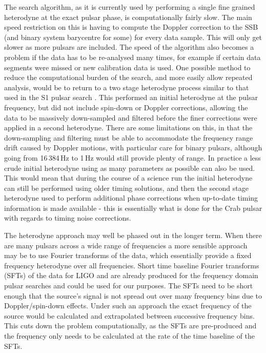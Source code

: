 The search algorithm, as it is currently used by performing a single fine grained heterodyne at the
exact pulsar phase, is computationally fairly slow. The main speed restriction on this is having to
compute the Doppler correction to the SSB (and binary system barycentre for some) for every data
sample. This will only get slower as more pulsars are included. The speed of the algorithm also
becomes a problem if the data has to be re-analysed many times, for example if certain data segments
were missed or new calibration data is used. One possible method to reduce the computational burden
of the search, and more easily allow repeated analysis, would be to return to a two stage heterodyne
process similar to that used in the S1 pulsar search \cite{Abbott:2004}. This performed an initial
heterodyne at the pulsar frequency, but did not include spin-down or Doppler corrections, allowing
the data to be massively down-sampled and filtered before the finer corrections were applied in a
second heterodyne. There are some limitations on this, in that the down-sampling and filtering must
be able to accommodate the frequency range drift caused by Doppler motions, with particular care for
binary pulsars, although going from 16\,384\,Hz to 1\,Hz would still provide plenty of range. In
practice a less crude initial heterodyne using as many parameters as possible can also be used. This
would mean that during the course of a science run the initial heterodyne can still be performed
using older timing solutions, and then the second stage heterodyne used to perform additional phase
corrections when up-to-date timing information is made available - this is essentially what is done
for the Crab pulsar with regards to timing noise corrections. 

The heterodyne approach may well be phased out in the longer term. When there are many pulsars
across a wide range of frequencies a more sensible approach may be to use Fourier transforms of the
data, which essentially provide a fixed frequency heterodyne over all frequencies. Short time
baseline Fourier transforms (SFTs) of the data for LIGO and \geo are already produced for the
frequency domain pulsar searches and could be used for our purposes. The SFTs need to be short
enough that the source's signal is not spread out over many frequency bins due to Doppler/spin-down
effects. Under such an approach the exact frequency of the source would be calculated and
extrapolated between successive frequency bins. This cuts down the problem computationally, as
the SFTs are pre-produced and the frequency only needs to be calculated at the rate of the time
baseline of the SFTs.

